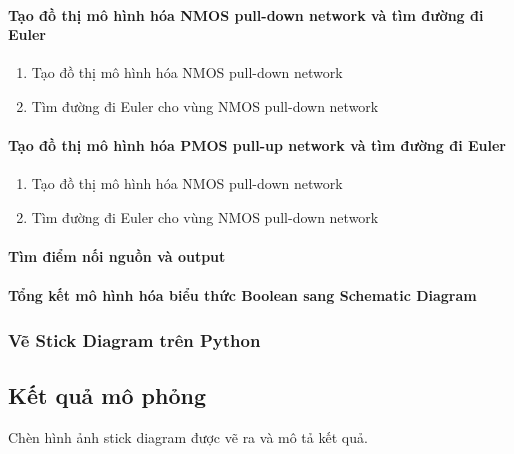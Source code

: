 \documentclass[a4paper,12pt]{article}
\begin{document}
\paragraph{Tạo đồ thị mô hình hóa NMOS pull-down network và tìm đường đi Euler}
\begin{enumerate}[label=\alph*.]
    \item{Tạo đồ thị mô hình hóa NMOS pull-down network}
    \item{Tìm đường đi Euler cho vùng NMOS pull-down network}
\end{enumerate}
\paragraph{Tạo đồ thị mô hình hóa PMOS pull-up network và tìm đường đi Euler}
\begin{enumerate}[label=\alph*.]
    \item{Tạo đồ thị mô hình hóa NMOS pull-down network}
    \item{Tìm đường đi Euler cho vùng NMOS pull-down network}
\end{enumerate}
\paragraph{Tìm điểm nối nguồn và output}
\paragraph{Tổng kết mô hình hóa biểu thức Boolean sang Schematic Diagram}
\subsubsection{Vẽ Stick Diagram trên Python}
\subsection{Kết quả mô phỏng}
Chèn hình ảnh stick diagram được vẽ ra và mô tả kết quả.
\newpage
\end{document}
